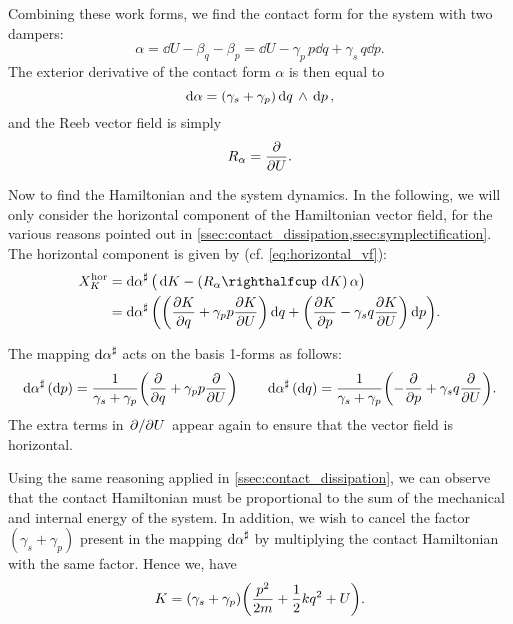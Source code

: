 Combining these work forms, we find the contact form for the system with two dampers:
\begin{equation}
    \alpha = \dd{U} - \beta_q - \beta_p = \dd{U} - \gamma_p\,p\dd{q} + \gamma_s\,q \dd{p}.
    \label{eq:serial_dho_contact_form}
\end{equation}
The exterior derivative of the contact form \(\alpha\) is then equal to
\begin{equation}
     \dd{\alpha} = (\gamma_s + \gamma_p)  \dd{q}\,\wedge\,\dd{p} ,
\end{equation}
and the Reeb vector field is simply
\begin{equation}
     R_\alpha = \pdv{}{U}.
\end{equation}

Now to find the Hamiltonian and the system dynamics. In the following, we will only consider the horizontal component of the Hamiltonian vector field, for the various reasons pointed out in \cref{ssec:contact_dissipation,ssec:symplectification}. The horizontal component is given by (cf. \cref{eq:horizontal_vf}):
\begin{equation}
    \begin{split}
        X^\text{hor}_K &= \fromDual{\dd{\alpha}}\big(\dd{K} - (\intpr{R_\alpha}{\dd{K}})\,\alpha\big) \\
                       &= \fromDual{\dd{\alpha}}\qty(\qty(\pdv{K}{q} + \gamma_p p \pdv{K}{U})\dd{q} + \qty(\pdv{K}{p} - \gamma_s q \pdv{K}{U})\dd{p}).
    \end{split}
\end{equation}

The mapping \(\dd{\alpha}^\sharp\) acts on the basis 1-forms as follows:
\begin{equation}
     \dd{\alpha}^\sharp(\dd{p}) = \frac{1}{\gamma_s + \gamma_p}\qty(\pdv{}{q} + \gamma_p p\pdv{}{U}) \qquad
    \dd{\alpha}^\sharp(\dd{q}) = \frac{1}{\gamma_s + \gamma_p}\qty(-\pdv{}{p} + \gamma_s q\pdv{}{U}).
\end{equation}
The extra terms in \( \pdv*{}{U}\) appear again to ensure that the vector field is horizontal.

Using the same reasoning applied in \cref{ssec:contact_dissipation}, we can observe that the contact Hamiltonian must be proportional to the sum of the mechanical and internal energy of the system. In addition, we wish to cancel the factor \((\gamma_s + \gamma_p)\) present in the mapping \(\dd{\alpha}^\sharp\) by multiplying the contact Hamiltonian with the same factor. Hence we, have
\begin{equation}
     K = (\gamma_s + \gamma_p)\qty(\frac{p^2}{2m} + \frac{1}{2}kq^2 + U).
\end{equation}

